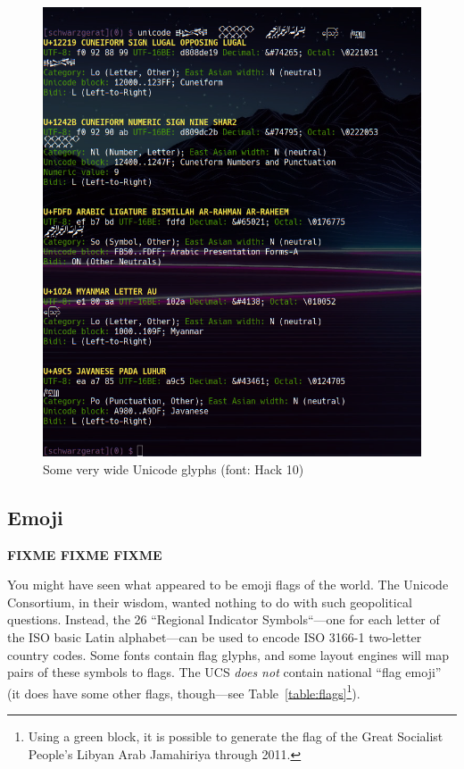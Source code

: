 \documentclass[letterpaper,10pt]{article}
\begin{document}
\begin{figure}[!htb]
\centering
\includegraphics[width=1\linewidth]{media/wide-unicode.png}
\caption[Some very wide Unicode glyphs]{Some very wide Unicode glyphs (font: Hack 10)}
\label{fig:wideglyphs}
\end{figure}

\subsection{Emoji}
\textbf{FIXME FIXME FIXME}

You might have seen what appeared to be emoji flags of the world. The Unicode
Consortium, in their wisdom, wanted nothing to do with such geopolitical
questions. Instead, the 26 ``Regional Indicator Symbols``---one for each
letter of the ISO basic Latin alphabet\cite{iso646}---can be used to encode
ISO 3166-1\cite{iso3166} two-letter country codes\cite{darkcorners}. Some fonts contain flag
glyphs, and some layout engines will map pairs of these symbols to flags. The
UCS \textit{does not} contain national ``flag emoji'' (it does have some other
flags, though---see Table~\ref{table:flags}\footnote{Using a green block,
it is possible to generate the flag of the Great Socialist People's Libyan Arab Jamahiriya through 2011.}).
\end{document}
